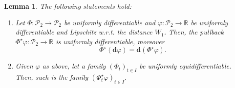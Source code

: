 \documentclass[sn-mathphys-num]{sn-jnl}
\numberwithin{equation}{section}
\theoremstyle{mythm}
\newtheorem{lemma}[proposition]{Lemma}
\theoremstyle{mydef}
\renewcommand{\phi}{\varphi}
\renewcommand{\mathbf}[1]{\bm{#1}}
\begin{document}
  \begin{lemma}\label{lem:Wcommut}
    The following statements hold:
    \begin{enumerate}[{\rm (i)}]
      \item Let \( \Phi\colon \mathcal{P}_2\to \mathcal{P}_2 \) be uniformly differentiable and \( \phi\colon \mathcal{P}_2\to \mathbb{R} \) be uniformly differentiable and Lipschitz w.r.t. the distance \( W_1 \).
  Then, the pullback \( \Phi^{\star}\phi\colon \mathcal{P}_2\to \mathbb{R} \) is uniformly differentiable, moreover
\[
  \Phi^\star(\mathbf{d} \phi) = \mathbf{d}(\Phi^\star \phi).
\]

\item Given $\phi$ as above, let a family $(\Phi_t)_{t \in I}$ be uniformly equidif\-fe\-ren\-ti\-able. Then, such is the family \(\left(\Phi^{\star}_t\phi\right)_{t\in I}\).
    \end{enumerate}
\end{lemma}
\end{document}
